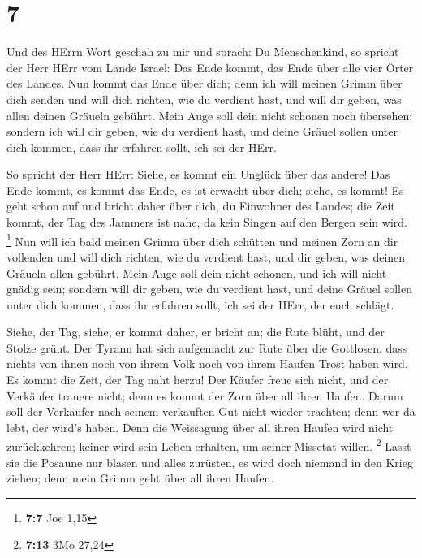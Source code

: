 \hypertarget{section-3}{%
\section{7}\label{section-3}}

 Und des HErrn Wort geschah zu mir und sprach: 
Du Menschenkind, so spricht der Herr HErr vom Lande Israel: Das Ende
kommt, das Ende über alle vier Örter des Landes.  Nun kommt
das Ende über dich; denn ich will meinen Grimm über dich senden und will
dich richten, wie du verdient hast, und will dir geben, was allen deinen
Gräueln gebührt.  Mein Auge soll dein nicht schonen noch
übersehen; sondern ich will dir geben, wie du verdient hast, und deine
Gräuel sollen unter dich kommen, dass ihr erfahren sollt, ich sei der
HErr.

 So spricht der Herr HErr: Siehe, es kommt ein Unglück über
das andere!  Das Ende kommt, es kommt das Ende, es ist
erwacht über dich; siehe, es kommt!  Es geht schon auf und
bricht daher über dich, du Einwohner des Landes; die Zeit kommt, der Tag
des Jammers ist nahe, da kein Singen auf den Bergen sein wird.
\footnote{\textbf{7:7} Joe 1,15}  Nun will ich bald meinen
Grimm über dich schütten und meinen Zorn an dir vollenden und will dich
richten, wie du verdient hast, und dir geben, was deinen Gräueln allen
gebührt.  Mein Auge soll dein nicht schonen, und ich will
nicht gnädig sein; sondern will dir geben, wie du verdient hast, und
deine Gräuel sollen unter dich kommen, dass ihr erfahren sollt, ich sei
der HErr, der euch schlägt.

 Siehe, der Tag, siehe, er kommt daher, er bricht an; die
Rute blüht, und der Stolze grünt.  Der Tyrann hat sich
aufgemacht zur Rute über die Gottlosen, dass nichts von ihnen noch von
ihrem Volk noch von ihrem Haufen Trost haben wird.  Es
kommt die Zeit, der Tag naht herzu! Der Käufer freue sich nicht, und der
Verkäufer trauere nicht; denn es kommt der Zorn über all ihren Haufen.
 Darum soll der Verkäufer nach seinem verkauften Gut nicht
wieder trachten; denn wer da lebt, der wird's haben. Denn die Weissagung
über all ihren Haufen wird nicht zurückkehren; keiner wird sein Leben
erhalten, um seiner Missetat willen. \footnote{\textbf{7:13} 3Mo 27,24}
 Lasst sie die Posaune nur blasen und alles zurüsten, es
wird doch niemand in den Krieg ziehen; denn mein Grimm geht über all
ihren Haufen.


